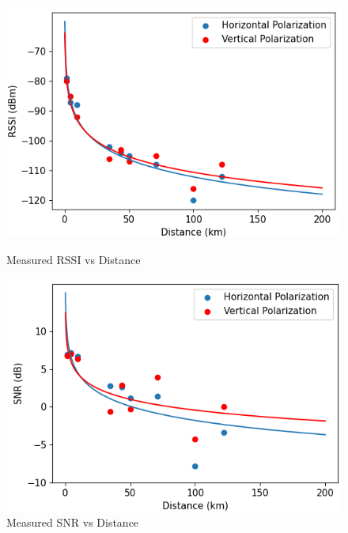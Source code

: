 \begin{figure}[!htb]
  \begin{minipage}{0.49\textwidth}
    \centering
    \includegraphics[width=0.99\linewidth]{rangeRssi}
    \caption{Measured RSSI vs Distance}
    \label{fig:rangeRssi}
  \end{minipage}
  \begin{minipage}{0.49\textwidth}
    \centering
    \includegraphics[width=0.99\linewidth]{rangeSnr}
    \caption{Measured SNR vs Distance}
    \label{fig:rangeSnr}
  \end{minipage}
\end{figure}

